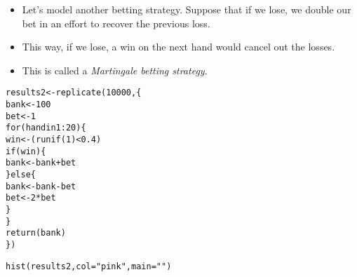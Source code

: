 \documentclass{beamer}\usepackage[]{graphicx}\usepackage[]{color}
\makeatletter
\newcommand{\hlnum}[1]{\textcolor[rgb]{0.824,0.412,0.118}{#1}}%
\newcommand{\hlstr}[1]{\textcolor[rgb]{1,0.894,0.71}{#1}}%
\newcommand{\hlopt}[1]{\textcolor[rgb]{1,0.894,0.769}{#1}}%
\newcommand{\hlstd}[1]{\textcolor[rgb]{1,0.894,0.769}{#1}}%
\newcommand{\hlkwa}[1]{\textcolor[rgb]{0.941,0.902,0.549}{#1}}%
\newcommand{\hlkwb}[1]{\textcolor[rgb]{0.804,0.776,0.451}{#1}}%
\newcommand{\hlkwc}[1]{\textcolor[rgb]{0.78,0.941,0.545}{#1}}%
\newcommand{\hlkwd}[1]{\textcolor[rgb]{1,0.78,0.769}{#1}}%
\newenvironment{kframe}{%
 \def\at@end@of@kframe{}%
 \ifinner\ifhmode%
  \def\at@end@of@kframe{\end{minipage}}%
  \begin{minipage}{\columnwidth}%
 \fi\fi%
 \def\FrameCommand##1{\hskip\@totalleftmargin \hskip-\fboxsep
 \colorbox{shadecolor}{##1}\hskip-\fboxsep
     \hskip-\linewidth \hskip-\@totalleftmargin \hskip\columnwidth}%
 \MakeFramed {\advance\hsize-\width
   \@totalleftmargin\z@ \linewidth\hsize
   \@setminipage}}%
 {\par\unskip\endMakeFramed%
 \at@end@of@kframe}
\newenvironment{knitrout}{}{} %
\makeatother
\begin{document}
\begin{darkframes}
\begin{frame}[fragile]
\begin{knitrout}
\end{knitrout}
    \end{frame}

    \begin{frame}
      \begin{itemize}
        \item Let's model another betting strategy. Suppose that if we lose, we double our bet in an effort to recover the previous loss.
        \item This way, if we lose, a win on the next hand would cancel out the losses.
        \item This is called a \emph{Martingale betting strategy}.
      \end{itemize}
    \end{frame}

    \begin{frame}[fragile]
      \fontsize{9}{9}\selectfont
\begin{knitrout}
\begin{kframe}
\begin{alltt}
\hlstd{results2} \hlkwb{<-} \hlkwd{replicate}\hlstd{(}\hlnum{10000}\hlstd{, \{}
  \hlstd{bank} \hlkwb{<-} \hlnum{100}
  \hlstd{bet} \hlkwb{<-} \hlnum{1}
  \hlkwa{for} \hlstd{(hand} \hlkwa{in} \hlnum{1}\hlopt{:}\hlnum{20}\hlstd{) \{}
    \hlstd{win} \hlkwb{<-} \hlstd{(}\hlkwd{runif}\hlstd{(}\hlnum{1}\hlstd{)} \hlopt{<} \hlnum{0.4}\hlstd{)}
    \hlkwa{if} \hlstd{(win) \{}
      \hlstd{bank} \hlkwb{<-} \hlstd{bank} \hlopt{+} \hlstd{bet}
    \hlstd{\}} \hlkwa{else} \hlstd{\{}
      \hlstd{bank} \hlkwb{<-} \hlstd{bank} \hlopt{-} \hlstd{bet}
      \hlstd{bet} \hlkwb{<-} \hlnum{2} \hlopt{*} \hlstd{bet}
    \hlstd{\}}
  \hlstd{\}}
  \hlkwd{return}\hlstd{(bank)}
\hlstd{\})}
\end{alltt}
\end{kframe}
\end{knitrout}
    \end{frame}

    \begin{frame}[fragile]
      
\begin{knitrout}
\begin{kframe}
\begin{alltt}
\hlkwd{hist}\hlstd{(results2,} \hlkwc{col}\hlstd{=}\hlstr{"pink"}\hlstd{,} \hlkwc{main}\hlstd{=}\hlstr{""}\hlstd{)}
\end{alltt}
\end{kframe}



\end{knitrout}
\end{frame}
\end{darkframes}
\end{document}
